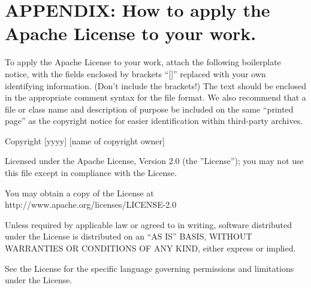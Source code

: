 \documentclass[a4paper, 12pt]{article}
\begin{document}
\section*{APPENDIX: How to apply the Apache License to your work.}

To apply the Apache License to your work, attach the following boilerplate notice, with the fields enclosed by brackets ``[]'' replaced with your own identifying information. (Don't include the brackets!) The text should be enclosed in the appropriate comment syntax for the file format. We also recommend that a file or class name and description of purpose be included on the same ``printed page'' as the copyright notice for easier identification within third-party archives.

\vspace{0.3cm}

Copyright [yyyy] [name of copyright owner]

\vspace{0.2cm}

Licensed under the Apache License, Version 2.0 (the ''License'');
you may not use this file except in compliance with the License.

\vspace{0.2cm}

You may obtain a copy of the License at http://www.apache.org/licenses/LICENSE-2.0

\vspace{0.2cm}

Unless required by applicable law or agreed to in writing, software  distributed under the License is distributed on an ``AS IS'' BASIS, WITHOUT WARRANTIES OR CONDITIONS OF ANY KIND, either express or implied.

\vspace{0.2cm}

See the License for the specific language governing permissions and limitations under the License.
\end{document}
